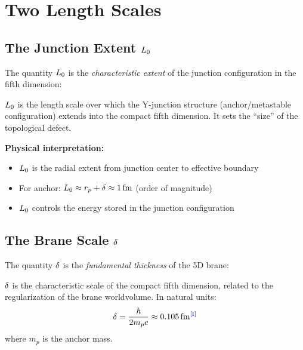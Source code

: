 \section{Two Length Scales}
\label{sec:L0delta:scales}

\subsection{The Junction Extent $L_0$}

The quantity $L_0$ is the \emph{characteristic extent} of the junction
configuration in the fifth dimension:

\begin{definition}
    $L_0$ is the length scale over which the Y-junction structure
    (anchor/metastable configuration) extends into the compact fifth dimension.
    It sets the ``size'' of the topological defect.
    \tagDc
\end{definition}

\textbf{Physical interpretation:}
\begin{itemize}
    \item $L_0$ is the radial extent from junction center to effective boundary
    \item For anchor: $L_0 \approx r_p + \delta \approx 1\,\mathrm{fm}$ (order of magnitude)
    \item $L_0$ controls the energy stored in the junction configuration
\end{itemize}

\subsection{The Brane Scale $\delta$}

The quantity $\delta$ is the \emph{fundamental thickness} of the 5D brane:

\begin{definition}
    $\delta$ is the characteristic scale of the compact fifth dimension,
    related to the regularization of the brane worldvolume. In natural units:
    \begin{equation}
        \bdelta = \frac{\hbar}{2 m_p c} \approx 0.105\fm
        \label{eq:delta_def}
        \tagI
    \end{equation}
    where $m_p$ is the anchor mass.
\end{definition}

